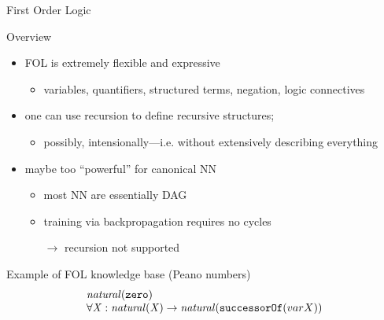 \documentclass[presentation]{beamer}\mode<presentation>{\usetheme{AMSBolognaFC}}
\begin{document}
\begin{frame}[allowframebreaks]{First Order Logic}
    \begin{block}{Overview}
        \begin{itemize}
            \item FOL is extremely flexible and expressive
            \begin{itemize}
                \item variables, quantifiers, structured terms, negation, logic connectives
            \end{itemize}
            
            \bigskip
    
            \item one can use \alert{recursion} to define recursive structures;
            \begin{itemize}
                \item possibly, \alert{intensionally}---i.e. without \alert{extensively} describing everything
            \end{itemize}
    
            \bigskip
    
            \item maybe too ``powerful'' for canonical NN
            \begin{itemize}
                \item most NN are essentially DAG
                \item training via backpropagation requires no cycles
                \item[$\rightarrow$] recursion not supported
            \end{itemize}
        \end{itemize}
    \end{block}

    \framebreak
    
    \begin{exampleblock}{Example of FOL knowledge base (Peano numbers)}
        \begin{equation*}
            \begin{array}{l}
                \mathit{natural}(\mathtt{zero})
                \\
                \forall\mathit{X} : \mathit{natural}(\mathit{X}) \rightarrow \mathit{natural}(\mathtt{successorOf}(var{X})) 
            \end{array}    
        \end{equation*}
    \end{exampleblock}
\end{frame}
\end{document}
